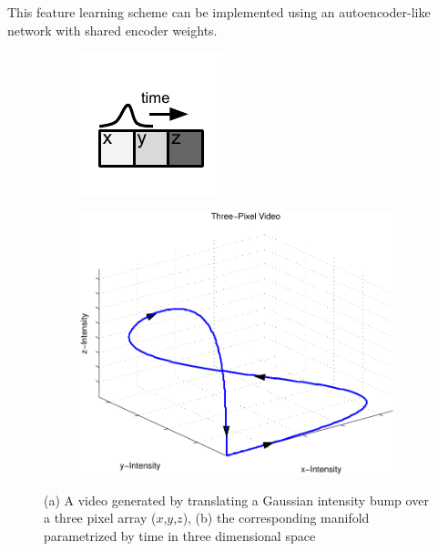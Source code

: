 \documentclass{article} %
\begin{document}
This feature learning scheme can be implemented using an autoencoder-like network with shared encoder weights. 
\begin{figure}
  \centering
  \begin{subfigure}[b]{0.15\textwidth}
        \includegraphics[width=\textwidth]{./figures/fig1.pdf}
        \caption{}
        \label{fig:3pixels}
  \end{subfigure}
  \begin{subfigure}[b]{0.45\textwidth}
        \includegraphics[width=\textwidth]{./figures/fig2.pdf} 
        \caption{}
        \label{fig:manifold}
  \end{subfigure}
  \caption{(a) A video generated by translating a Gaussian intensity bump over a three pixel array ($x$,$y$,$z$), (b) the corresponding manifold parametrized by time in three dimensional space}
  \label{fig:threepixel}
\end{figure}
\end{document}
